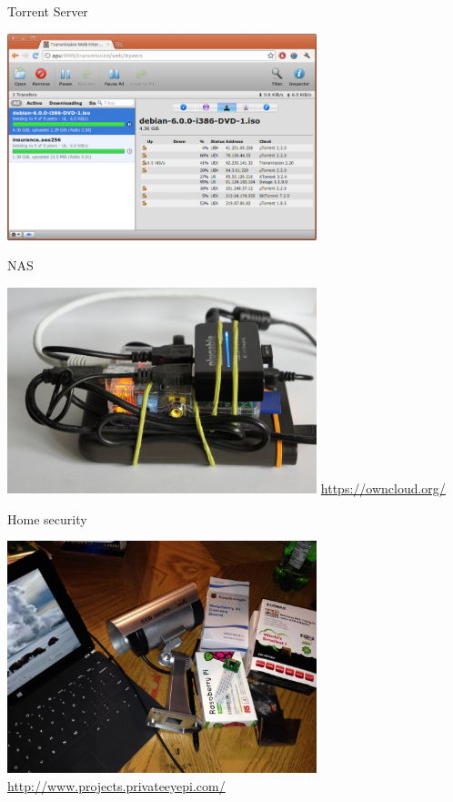 \documentclass[xcolor=svgnames,11pt]{beamer}
\begin{document}
\begin{frame}{Torrent Server}
\begin{center}
\includegraphics[width=9cm]{uc/torrent.png}
\end{center}
\end{frame}

\begin{frame}{NAS}
\begin{center}
\includegraphics[width=9cm]{uc/nas.jpg}
\newline
\medskip
\url{https://owncloud.org/}
\end{center}
\end{frame}

\begin{frame}{Home security}
\begin{center}
\includegraphics[width=9cm]{uc/security.jpg}
\newline
\medskip
\url{http://www.projects.privateeyepi.com/}
\end{center}
\end{frame}
\end{document}
